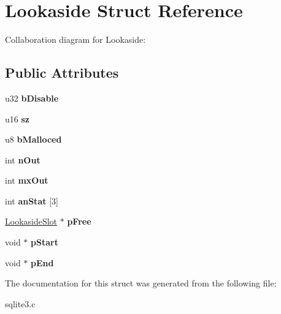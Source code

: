 \hypertarget{structLookaside}{}\section{Lookaside Struct Reference}
\label{structLookaside}


Collaboration diagram for Lookaside\+:
\subsection*{Public Attributes}
\begin{DoxyCompactItemize}
\item 
u32 {\bfseries b\+Disable}\hypertarget{structLookaside_ac81ee3b5b12d0bc89ed1286718224db1}{}\label{structLookaside_ac81ee3b5b12d0bc89ed1286718224db1}

\item 
u16 {\bfseries sz}\hypertarget{structLookaside_a2e8346b6cebbb64d9a6886a19ef843a1}{}\label{structLookaside_a2e8346b6cebbb64d9a6886a19ef843a1}

\item 
u8 {\bfseries b\+Malloced}\hypertarget{structLookaside_a218f14cf9eb2c430867d286e9ac57ac5}{}\label{structLookaside_a218f14cf9eb2c430867d286e9ac57ac5}

\item 
int {\bfseries n\+Out}\hypertarget{structLookaside_a4cdd49fa554f877928d5bb31d55b32e9}{}\label{structLookaside_a4cdd49fa554f877928d5bb31d55b32e9}

\item 
int {\bfseries mx\+Out}\hypertarget{structLookaside_a2ce364d95b55913df986999de442e4f9}{}\label{structLookaside_a2ce364d95b55913df986999de442e4f9}

\item 
int {\bfseries an\+Stat} \mbox{[}3\mbox{]}\hypertarget{structLookaside_a7d875204cb05a327bb1652139faa4374}{}\label{structLookaside_a7d875204cb05a327bb1652139faa4374}

\item 
\hyperlink{structLookasideSlot}{Lookaside\+Slot} $\ast$ {\bfseries p\+Free}\hypertarget{structLookaside_a318d2faa7f976f9d1b3c6e08bdc1d992}{}\label{structLookaside_a318d2faa7f976f9d1b3c6e08bdc1d992}

\item 
void $\ast$ {\bfseries p\+Start}\hypertarget{structLookaside_a47073fcdffdc5a7a1464f0d09bfc17f9}{}\label{structLookaside_a47073fcdffdc5a7a1464f0d09bfc17f9}

\item 
void $\ast$ {\bfseries p\+End}\hypertarget{structLookaside_ad3555c5558e104f2b82f62bf642cf831}{}\label{structLookaside_ad3555c5558e104f2b82f62bf642cf831}

\end{DoxyCompactItemize}


The documentation for this struct was generated from the following file\+:\begin{DoxyCompactItemize}
\item 
sqlite3.\+c\end{DoxyCompactItemize}
